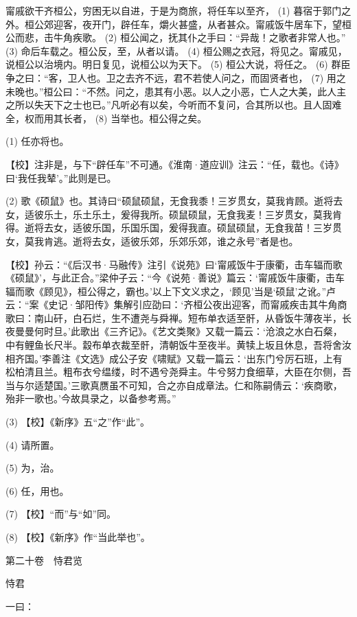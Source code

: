 \documentclass[12pt,UTF8]{ctexbook}
\begin{document}
甯戚欲干齐桓公，穷困无以自进，于是为商旅，将任车以至齐， (1) 暮宿于郭门之外。桓公郊迎客，夜开门，辟任车，爝火甚盛，从者甚众。甯戚饭牛居车下，望桓公而悲，击牛角疾歌。 (2) 桓公闻之，抚其仆之手曰：“异哉！之歌者非常人也。” (3) 命后车载之。桓公反，至，从者以请。 (4) 桓公赐之衣冠，将见之。甯戚见，说桓公以治境内。明日复见，说桓公以为天下。 (5) 桓公大说，将任之。 (6) 群臣争之曰：“客，卫人也。卫之去齐不远，君不若使人问之，而固贤者也， (7) 用之未晚也。”桓公曰：“不然。问之，患其有小恶。以人之小恶，亡人之大美，此人主之所以失天下之士也已。”凡听必有以矣，今听而不复问，合其所以也。且人固难全，权而用其长者， (8) 当举也。桓公得之矣。

(1) 任亦将也。

【校】注非是，与下“辟任车”不可通。《淮南·道应训》注云：“任，载也。《诗》曰‘我任我辇’。”此则是已。

(2) 歌《硕鼠》也。其诗曰“硕鼠硕鼠，无食我黍！三岁贯女，莫我肯顾。逝将去女，适彼乐土，乐土乐土，爰得我所。硕鼠硕鼠，无食我麦！三岁贯女，莫我肯得。逝将去女，适彼乐国，乐国乐国，爰得我直。硕鼠硕鼠，无食我苗！三岁贯女，莫我肯逃。逝将去女，适彼乐郊，乐郊乐郊，谁之永号”者是也。

【校】孙云：“《后汉书·马融传》注引《说苑》曰‘甯戚饭牛于康衢，击车辐而歌《硕鼠》’，与此正合。”梁仲子云：“今《说苑·善说》篇云：‘甯戚饭牛康衢，击车辐而歌《顾见》，桓公得之，霸也。’以上下文义求之，‘顾见’当是‘硕鼠’之讹。”卢云：“案《史记·邹阳传》集解引应劭曰：‘齐桓公夜出迎客，而甯戚疾击其牛角商歌曰：南山矸，白石烂，生不遭尧与舜禅。短布单衣适至骭，从昏饭牛薄夜半，长夜曼曼何时旦。’此歌出《三齐记》。《艺文类聚》又载一篇云：‘沧浪之水白石粲，中有鲤鱼长尺半。縠布单衣裁至骭，清朝饭牛至夜半。黄犊上坂且休息，吾将舍汝相齐国。’李善注《文选》成公子安《啸赋》又载一篇云：‘出东门兮厉石班，上有松柏清且兰。粗布衣兮缊缕，时不遇兮尧舜主。牛兮努力食细草，大臣在尔侧，吾当与尔适楚国。’三歌真赝虽不可知，合之亦自成章法。仁和陈嗣倩云：‘疾商歌，殆非一歌也。’今故具录之，以备参考焉。”

(3) 【校】《新序》五“之”作“此”。

(4) 请所置。

(5) 为，治。

(6) 任，用也。

(7) 【校】“而”与“如”同。

(8) 【校】《新序》作“当此举也”。





第二十卷　恃君览



恃君


一曰：
\end{document}
